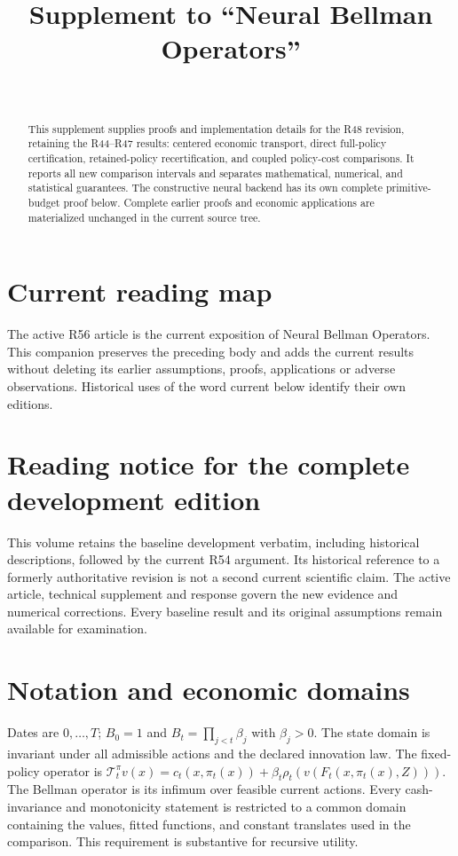 \documentclass[ecta,nameyear,draft]{econsocart}
\begin{document}
\begin{frontmatter}
\title{Supplement to ``Neural Bellman Operators''}
\begin{aug}
\author[id=au1,addressref={add1}]{~}
\address[id=add1]{Peking University}
\end{aug}
\begin{abstract}
This supplement supplies proofs and implementation details for the R48 revision, retaining the R44--R47 results: centered economic transport, direct full-policy certification, retained-policy recertification, and coupled policy-cost comparisons. It reports all new comparison intervals and separates mathematical, numerical, and statistical guarantees. The constructive neural backend has its own complete primitive-budget proof below. Complete earlier proofs and economic applications are materialized unchanged in the current source tree.
\end{abstract}
\end{frontmatter}
\section*{Current reading map}
The active R56 article is the current exposition of Neural Bellman Operators. This companion preserves the preceding body and adds the current results without deleting its earlier assumptions, proofs, applications or adverse observations. Historical uses of the word current below identify their own editions.

\section*{Reading notice for the complete development edition}
This volume retains the baseline development verbatim, including historical descriptions, followed by the current R54 argument. Its historical reference to a formerly authoritative revision is not a second current scientific claim. The active article, technical supplement and response govern the new evidence and numerical corrections. Every baseline result and its original assumptions remain available for examination.

\section{Notation and economic domains}
Dates are $0,\ldots,T$; $B_0=1$ and $B_t=\prod_{j<t}\beta_j$ with $\beta_j>0$. The state domain is invariant under all admissible actions and the declared innovation law. The fixed-policy operator is
$\mathcal T_t^\pi v(x)=c_t(x,\pi_t(x))+\beta_t\rho_t(v(F_t(x,\pi_t(x),Z)))$.
The Bellman operator is its infimum over feasible current actions. Every cash-invariance and monotonicity statement is restricted to a common domain containing the values, fitted functions, and constant translates used in the comparison. This requirement is substantive for recursive utility.
\end{document}
